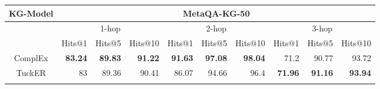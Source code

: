 \begin{table}[]
\centering
\footnotesize
\begin{tabular}{cccccccccc}
\hline
\multicolumn{1}{c|}{\textbf{KG-Model}} & \multicolumn{9}{c}{\textbf{MetaQA-KG-50}}                                                                                                                                                                                                                                                                                                         \\ \hline
\multicolumn{1}{c|}{}                  & \multicolumn{3}{c|}{1-hop}                                                                                      & \multicolumn{3}{c|}{2-hop}                                                                                      & \multicolumn{3}{c}{3-hop}                                                                                     \\ \hline
\multicolumn{1}{c|}{}                  & \multicolumn{1}{c|}{Hits@1}         & \multicolumn{1}{c|}{Hits@5}         & \multicolumn{1}{c|}{Hits@10}        & \multicolumn{1}{c|}{Hits@1}        & \multicolumn{1}{c|}{Hits@5}         & \multicolumn{1}{c|}{Hits@10}         & \multicolumn{1}{c|}{Hits@1}         & \multicolumn{1}{c|}{Hits@5}        & Hits@10                             \\ \hline
\multicolumn{1}{c|}{ComplEx}           & \multicolumn{1}{r|}{\textbf{83.24}} & \multicolumn{1}{r|}{\textbf{89.83}} & \multicolumn{1}{r|}{\textbf{91.22}} & \multicolumn{1}{r|}{\textbf{91.63}} & \multicolumn{1}{r|}{\textbf{97.08}} & \multicolumn{1}{r|}{\textbf{98.04}} & \multicolumn{1}{r|}{71.2}           & \multicolumn{1}{r|}{90.77}          & \multicolumn{1}{r}{93.72}          \\ \hline
\multicolumn{1}{c|}{TuckER}            & \multicolumn{1}{r|}{83}             & \multicolumn{1}{r|}{89.36}          & \multicolumn{1}{r|}{90.41}          & \multicolumn{1}{r|}{86.07}          & \multicolumn{1}{r|}{94.66}          & \multicolumn{1}{r|}{96.4}           & \multicolumn{1}{r|}{\textbf{71.96}} & \multicolumn{1}{r|}{\textbf{91.16}} & \multicolumn{1}{r}{\textbf{93.94}} \\ \hline
                                       &                                     &                                     &                                     &                                     &                                     &                                     &                                     &                                     &                                    \\ \hline

\end{tabular}
\end{table}
